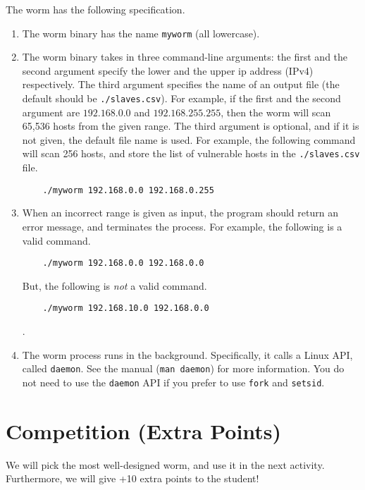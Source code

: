 \documentclass[a4paper, 11pt]{article}
\theoremstyle{definition}
\begin{document}
{The worm has the following specification.

\begin{enumerate}

  \item The worm binary has the name \texttt{myworm} (all lowercase).

  \item The worm binary takes in three command-line arguments: the
    first and the second argument specify the lower and the upper ip
    address (IPv4) respectively. The third argument specifies the name
    of an output file (the default should be \texttt{./slaves.csv}).
    For example, if the first and the second argument are
    $192.168.0.0$ and $192.168.255.255$, then the worm will scan
    65,536 hosts from the given range.
    The third argument is optional, and if it is not given, the
    default file name is used. For example, the following command will
    scan 256 hosts, and store the list of vulnerable hosts in the
    \texttt{./slaves.csv} file.
    \begin{verbatim}
    ./myworm 192.168.0.0 192.168.0.255
    \end{verbatim}

  \item When an incorrect range is given as input, the program should
    return an error message, and terminates the process. For example,
    the following is a valid command.
    \begin{verbatim}
    ./myworm 192.168.0.0 192.168.0.0
    \end{verbatim} But, the following is \emph{not} a valid command.
    \begin{verbatim}
    ./myworm 192.168.10.0 192.168.0.0
    \end{verbatim}.

  \item The worm process runs in the background. Specifically, it
    calls a Linux API, called \texttt{daemon}. See the manual
    (\texttt{man daemon}) for more information. You do not need to use
    the \texttt{daemon} API if you prefer to use \texttt{fork} and
    \texttt{setsid}.

\end{enumerate}

\section{Competition (Extra Points)}

We will pick the most well-designed worm, and use it in the next
activity. Furthermore, we will give +10 extra points to the student!

}
\end{document}
